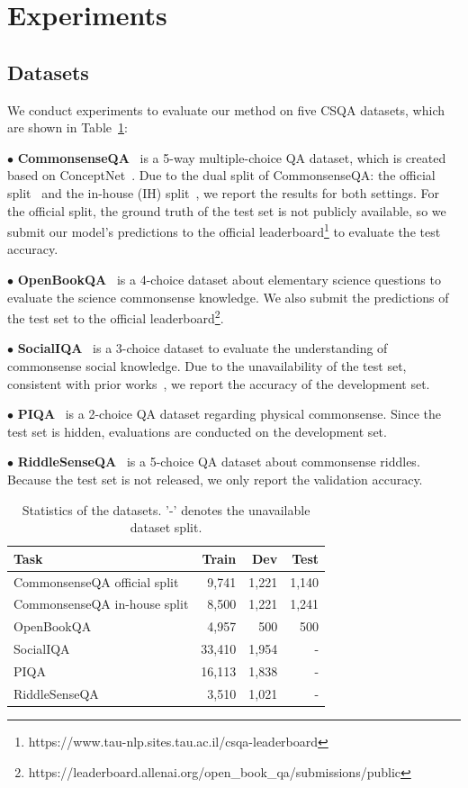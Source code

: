 \documentclass[runningheads]{llncs}
\begin{document}
\section{Experiments}
\subsection{Datasets}
We conduct experiments to evaluate our method on five CSQA datasets, which are shown in Table~\ref{tab:dataset}:

$\bullet$ \textbf{CommonsenseQA}~\cite{ref:csqa} is a 5-way multiple-choice QA dataset, which is created based on ConceptNet~\cite{ref:cpnet}. Due to the dual split of CommonsenseQA: the official split~\cite{ref:csqa} and the in-house (IH) split~\cite{ref:kagnet}, we report the results for both settings. For the official split, the ground truth of the test set is not publicly available, so we submit our model's predictions to the official leaderboard\footnote{https://www.tau-nlp.sites.tau.ac.il/csqa-leaderboard} to evaluate the test accuracy.

$\bullet$ \textbf{OpenBookQA}~\cite{ref:obqa} is a 4-choice dataset about elementary science questions to evaluate the science commonsense knowledge. We also submit the predictions of the test set to the official leaderboard\footnote{https://leaderboard.allenai.org/open\_book\_qa/submissions/public}.

$\bullet$ \textbf{SocialIQA}~\cite{ref:socialiqa} is a 3-choice dataset to evaluate the understanding of commonsense social knowledge. Due to the unavailability of the test set, consistent with prior works~\cite{ref:siqa}, we report the accuracy of the development set.

$\bullet$ \textbf{PIQA}~\cite{ref:piqa} is a 2-choice QA dataset regarding physical commonsense. Since the test set is hidden, evaluations are conducted on the development set.

$\bullet$ \textbf{RiddleSenseQA}~\cite{ref:riddlesense} is a 5-choice QA dataset about commonsense riddles. Because the test set is not released, we only report the validation accuracy.
\begin{table}[t!]
    \caption{Statistics of the datasets. '-' denotes the unavailable dataset split.}
    \centering
    \resizebox{0.6\linewidth}{!} {
    \begin{tabular}{l|rrr}
    \toprule
    \textbf{Task} & \textbf{Train} & \textbf{Dev} & \textbf{Test} \\ 
    \midrule
    CommonsenseQA official split & 9,741 & 1,221 & 1,140 \\
    CommonsenseQA in-house split & 8,500 & 1,221 & 1,241 \\
    OpenBookQA & 4,957 & 500 & 500 \\
    SocialIQA & 33,410 & 1,954 & - \\
    PIQA & 16,113 & 1,838 & - \\
    RiddleSenseQA & 3,510 & 1,021 & - \\
    \bottomrule
    \end{tabular}
    }
    \label{tab:dataset}
\end{table}
\end{document}
